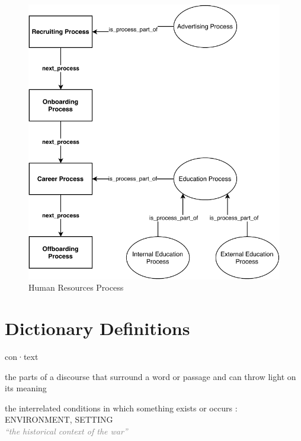 \documentclass[a4paper, DIV=13, BCOR=0cm]{scrbook}
\begin{document}
\begin{figure}[h]
	\caption{Human Resources Process}
	\centering
	\includegraphics[width=1\textwidth]{Diagrams/hr-process.pdf}
\end{figure}

\clearpage
\printnoidxglossaries

\printbibliography

\newpage

\section{Dictionary Definitions}
\label{dictionary}

\begin{mdframed}[%
	linewidth=1pt,%
	frametitlerule=true,%
	frametitlebackgroundcolor=gray!20,%
	innertopmargin=\topskip,%
	frametitlefont=\normalfont,%
	frametitle={{\textbf{context}} {\scriptsize\textsc{noun \hfill Merriam-Webster}}}%
	]
	
	{\small con·​text
		\begin{compactenum}
			\item the parts of a discourse that surround a word or passage and can throw light on its meaning
			\item the interrelated conditions in which something exists or occurs : ENVIRONMENT, SETTING \\
			\textcolor{gray}{\textit{\enquote{the historical context of the war}}}
		\end{compactenum}
	}
\end{mdframed}
\end{document}
